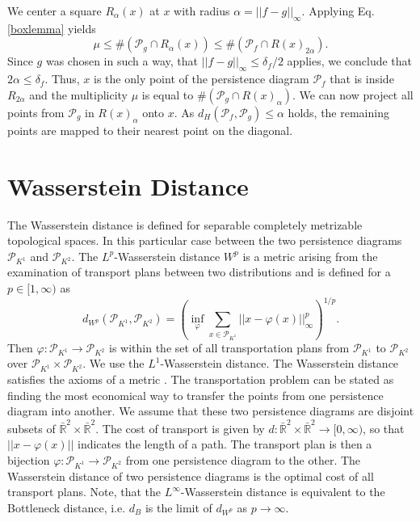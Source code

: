 \documentclass[runningheads]{llncs}
\begin{document}
We center a square $R_\alpha(x)$ at $x$ with radius $\alpha = ||f-g||_\infty$. Applying Eq. \ref{boxlemma} yields
\begin{equation}
\mu \leq \#(\mathcal{P}_g \cap R_\alpha(x)) \leq \#(\mathcal{P}_f \cap R(x)_{2\alpha}).
\end{equation}
Since $g$ was chosen in such a way, that $||f-g||_\infty \leq \delta_f / 2$ applies, we conclude that $2 \alpha \leq \delta_f$. Thus, $x$ is the only point of the persistence diagram $\mathcal{P}_f$ that is inside $R_{2\alpha}$ and the multiplicity $\mu$ is equal to $\#(\mathcal{P}_g \cap R(x)_\alpha)$. We can now project all points from $\mathcal{P}_g$ in $R(x)_\alpha$ onto $x$. As $d_H(\mathcal{P}_f, \mathcal{P}_g) \leq \alpha$ holds, the remaining points are mapped to their nearest point on the diagonal.

\section{Wasserstein Distance}
The Wasserstein distance is defined for separable completely metrizable topological spaces. In this particular case between the two persistence diagrams $\mathcal{P}_{K^1}$ and $\mathcal{P}_{K^2}$. The $L^p$-Wasserstein distance $W^p$ is a metric arising from the examination of transport plans between two distributions and is defined for a $p \in [1,\infty)$ as
\begin{equation}
d_{W^p}(\mathcal{P}_{K^1},\mathcal{P}_{K^2}) = \left(\inf_{\varphi} \sum_{x \in \mathcal{P}_{K^1}} ||x-\varphi(x)||^p_\infty\right)^{1/p}.
\end{equation}
Then $\varphi: \mathcal{P}_{K^1}\rightarrow \mathcal{P}_{K^2}$ is within the set of all transportation plans from $\mathcal{P}_{K^1}$ to $\mathcal{P}_{K^2}$ over $\mathcal{P}_{K^1} \times \mathcal{P}_{K^2}$. We use the $L^1$-Wasserstein distance. The Wasserstein distance satisfies the axioms of a metric \cite[p.~77]{villani2008optimal}. The transportation problem can be stated as finding the most economical way to transfer the points from one persistence diagram into another. We assume that these two persistence diagrams are disjoint subsets of $\bar{\mathbb{R}}^2 \times \bar{\mathbb{R}}^2$. The cost of transport is given by $d: \bar{\mathbb{R}}^2 \times \bar{\mathbb{R}}^2 \rightarrow [0,\infty)$, so that $||x-\varphi(x)||$ indicates the length of a path. The transport plan is then a bijection $\varphi: \mathcal{P}_{K^1} \rightarrow \mathcal{P}_{K^2}$ from one persistence diagram to the other. The Wasserstein distance of two persistence diagrams is the optimal cost of all transport plans. Note, that the $L^\infty$-Wasserstein distance is equivalent to the Bottleneck distance, i.e. $d_{B}$ is the limit of $d_{W^p}$ as $p \rightarrow \infty$.
\end{document}
